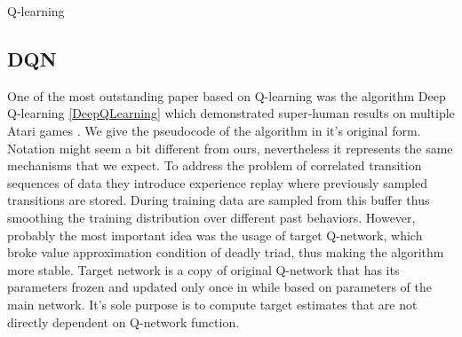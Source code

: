 \begin{algorithm}
  \caption{Q-learning}
  \label{Qlearning}
\end{algorithm}






\subsection*{DQN}
One of the most outstanding paper based on Q-learning was the algorithm Deep Q-learning \ref{DeepQLearning} which demonstrated super-human results on multiple Atari games \cite{Atari}.
We give the pseudocode of the algorithm in it's original form.
Notation might seem a bit different from ours, nevertheless it represents the same mechanisms that we expect.
To address the problem of correlated transition sequences of data they introduce experience replay where previously sampled transitions are stored.
During training data are sampled from this buffer thus smoothing the training distribution over different past behaviors.
However, probably the most important idea was the usage of target Q-network, which broke value approximation condition of deadly triad, thus making the algorithm more stable.
Target network is a copy of original Q-network that has its parameters frozen and updated only once in while based on parameters of the main network.
It's sole purpose is to compute target estimates that are not directly dependent on Q-network function.

